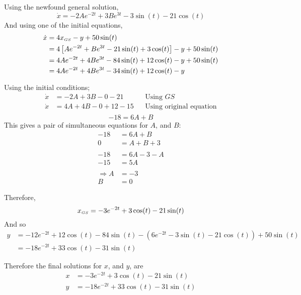 \documentclass[11pt, a4paper]{article}
\begin{document}
Using the newfound general solution,
\begin{equation*}
\dot{x}=-2Ae^{-2t}+3Be^{3t}-3\sin(t)-21\cos(t)
\end{equation*}
And using one of the initial equations,
\begin{align*}
\dot{x}&=4x_{\text{\tiny{$GS$}}}-y+50\sin(t) \\
&=4\left[ Ae^{-2t}+Be^{3t}-21\sin(t)+3\cos(t) \right] -y+50\sin(t) \\
&=4Ae^{-2t}+4Be^{3t}-84\sin(t)+12\cos(t)-y+50\sin(t) \\
&=4Ae^{-2t}+4Be^{3t}-34\sin(t)+12\cos(t)-y
\end{align*}

Using the initial conditions;
\begin{align*}
\dot{x}&=-2A+3B-0-21 & &\text{Using $GS$} \\
\dot{x}&=4A+4B-0+12-15 & &\text{Using original equation} \\
\end{align*}
\vspace{-1.2cm}
\begin{equation*}
-18=6A+B
\end{equation*} \newline
This gives a pair of simultaneous equations for $A$, and $B$:
\begin{align*}
-18&=6A+B \\
0&=A+B+3 \\
& \\
-18&=6A-3-A \\
-15&=5A \\
& \\
\Rightarrow A&=-3 \\
B&=0
\end{align*}

Therefore,
\begin{equation*}
x_{\text{\tiny{$GS$}}}=-3e^{-2t}+3\cos(t)-21\sin(t)
\end{equation*}
And so
\small
\begin{align*}
y&=-12e^{-2t}+12\cos(t)-84\sin(t)-\left(6e^{-2t}-3\sin(t)-21\cos(t)\right)+50\sin(t) \\
&=-18e^{-2t}+33\cos(t)-31\sin(t)
\end{align*}
\normalsize

Therefore the final solutions for $x$, and $y$, are
\begin{align*}
x&=-3e^{-2t}+3\cos(t)-21\sin(t) \\
y&=-18e^{-2t}+33\cos(t)-31\sin(t)
\end{align*}
\vspace{0.5cm}
\end{document}
